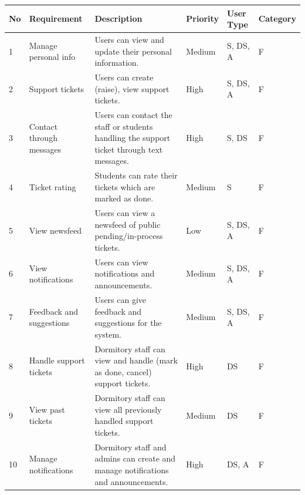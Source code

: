 \begin{longtable}{|m{0.6cm}|m{2.8cm}|m{5.4cm}|m{1.6cm}|m{1.5cm}|m{1.8cm}|}
	\hline
	\textbf{No} & \textbf{Requirement }             & \textbf{Description}                                                                                          & \textbf{Priority} & \textbf{User Type}  & \textbf{Category} \\ \hline
	\endhead
	1  & Manage personal info     & Users can view and update their personal information.                                                 & Medium   & S, DS, A   & F           \\ \hline
	2  & Support tickets          & Users can create (raise), view support tickets.                                                       & High     & S, DS, A   & F           \\ \hline
	3  & Contact through messages & Users can contact the staff or students handling the support ticket through text messages.            & High     & S, DS      & F           \\ \hline
	4  & Ticket rating            & Students can rate their tickets which are marked as done.                                             & Medium   & S          & F           \\ \hline
	5  & View newsfeed            & Users can view a newsfeed of public pending/in-process tickets.                                        & Low      & S, DS, A   & F           \\ \hline
	6  & View notifications       & Users can view notifications and announcements.                                                       & Medium   & S, DS, A   & F           \\ \hline
	7  & Feedback and suggestions & Users can give feedback and suggestions for the system.                                                & Medium   & S, DS, A   & F          \\ \hline
	8  & Handle support tickets   & Dormitory staff can view and handle (mark as done, cancel) support tickets.                            & High     & DS         & F           \\ \hline
	9  & View past tickets        & Dormitory staff can view all previously handled support tickets.                                       & Medium   & DS         & F           \\ \hline
	10 & Manage notifications     & Dormitory staff and admins can create and manage notifications and announcements.                      & High     & DS, A      & F           \\ \hline

\end{longtable}
